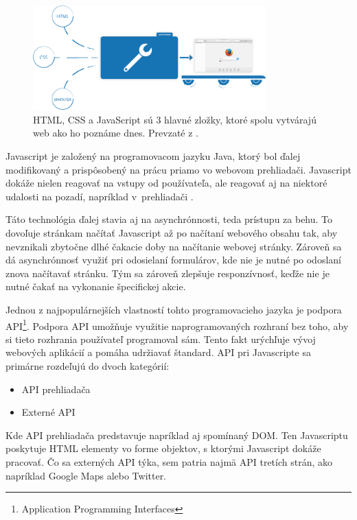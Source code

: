 \newpage
\begin{figure}[hbt]
	\centering
	\includegraphics[width=0.8\textwidth]{obrazky-figures/jsexecution.png}
	\caption{HTML, CSS a JavaScript sú 3 hlavné zložky, ktoré spolu vytvárajú web ako ho poznáme dnes. Prevzaté z \cite{Javascript}.}
	\label{Jsexecution_img}
\end{figure}

\bigskip

Javascript je založený na programovacom jazyku Java, ktorý bol ďalej modifikovaný a prispôsobený na prácu priamo vo webovom prehliadači. Javascript dokáže nielen reagovať na vstupy od používateľa, ale reagovať aj na niektoré udalosti na pozadí, napríklad v~prehliadači \cite{Javascript}. 

Táto technológia ďalej stavia aj na asynchrónnosti, teda prístupu za behu. To dovoľuje stránkam načítať Javascript až po načítaní webového obsahu tak, aby nevznikali zbytočne dlhé čakacie doby na načítanie webovej stránky. Zároveň sa dá asynchrónnosť využiť pri odosielaní formulárov, kde nie je nutné po odoslaní znova načítavať stránku. Tým sa zároveň zlepšuje responzívnosť, keďže nie je nutné čakať na vykonanie špecifickej akcie. 

Jednou z najpopulárnejších vlastností tohto programovacieho jazyka je podpora API\footnote{Application Programming Interfaces}. Podpora API umožňuje využitie naprogramovaných rozhraní bez toho, aby si tieto rozhrania používateľ programoval sám. Tento fakt urýchľuje vývoj webových aplikácií a pomáha udržiavať štandard. API pri Javascripte sa primárne rozdeľujú do dvoch kategórií:

\begin{itemize}
    \item {API prehliadača}
    \item {Externé API}
\end{itemize}

Kde API prehliadača predstavuje napríklad aj spomínaný DOM. Ten Javascriptu poskytuje HTML elementy vo forme objektov, s ktorými Javascript dokáže pracovať. Čo sa externých API týka, sem patria najmä API tretích strán, ako napríklad Google Maps alebo Twitter.

